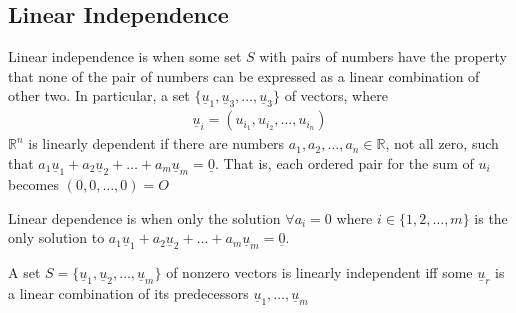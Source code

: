 \documentclass[a4paper]{article}
\theoremstyle{plain}
\newtheorem{thm}{Theorem}[section]
\theoremstyle{definition}
\newtheorem{defn}{Definition}[section]
\theoremstyle{remark}
\begin{document}
\subsection{Linear Independence}
\begin{tcolorbox}[colback=black!3!white,colframe=black!60!white,title=\begin{defn}Linear Dependence \label{Linear Dependence}\end{defn}]
Linear independence is when some set $S$ with pairs of numbers have the property that none of the pair of numbers can be expressed as a linear combination of other two. In particular, a set $\{ \underline{u}_1, \underline{u}_3,\ldots,\underline{u}_3\}$ of vectors, where
	\begin{align}
		\underline{u}_i = (u_i_1,u_i_2,\ldots,u_i_n)
	\end{align}$\mathbb{R}^{n}$ is linearly dependent if there are numbers $a_1,a_2,\ldots,a_n \in \mathbb{R}$, not all zero, such that $a_1\underline{u}_1 + a_2 \underline{u}_2 + \ldots+a_m \underline{u}_m = \underline{0}$. That is, each ordered pair for the sum of $u_i$ becomes $(0,0,\ldots,0) = O$
\end{tcolorbox}
\begin{tcolorbox}[colback=black!3!white,colframe=black!60!white,title=\begin{defn}Linear Independence \label{ind}\end{defn}]
Linear dependence is when only the solution $\forall a_i = 0$ where $i \in \{1,2,\ldots,m\}$ is the only solution to $a_1\underline{u}_1 + a_2 \underline{u}_2 + \ldots+a_m \underline{u}_m = \underline{0}$.
\end{tcolorbox}
\begin{tcolorbox}[colback=black!3!white,colframe=black!60!white,title=\begin{thm}Linear Independence \label{Linearly Independence}\end{thm}]
	A set $S = \{ \underline{u}_1, \underline{u}_2, \ldots , \underline{u}_m\}$ of nonzero vectors is linearly independent iff some $\underline{u}_r$ is a linear combination of its predecessors $\underline{u}_1, \ldots, \underline{u}_{m}$ 
\end{tcolorbox}
\end{document}
